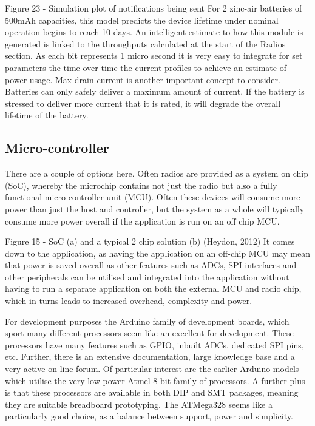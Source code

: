 \documentclass[]{article}
\begin{document}
 
Figure 23 - Simulation plot of notifications being sent
For 2 zinc-air batteries of 500mAh capacities, this model predicts the device lifetime under nominal operation begins to reach 10 days.  An intelligent estimate to how this module is generated is linked to the throughputs calculated at the start of the Radios section. As each bit represents 1 micro second it is very easy to integrate for set parameters the time over time the current profiles to achieve an estimate of power usage. 
Max drain current is another important concept to consider. Batteries can only safely deliver a maximum amount of current. If the battery is stressed to deliver more current that it is rated, it will degrade the overall lifetime of the battery. 

\subsection{Micro-controller}
There are a couple of options here. Often radios are provided as a system on chip (SoC), whereby the microchip contains not just the radio but also a fully functional micro-controller unit (MCU). Often these devices will consume more power than just the host and controller, but the system as a whole will typically consume more power overall if the application is run on an off chip MCU. 
 
Figure 15 - SoC (a) and a typical 2 chip solution (b) (Heydon, 2012)
It comes down to the application, as having the application on an off-chip MCU may mean that power is saved overall as other features such as ADCs, SPI interfaces and other peripherals can be utilised and integrated into the application without having to run a separate application on both the external MCU and radio chip, which in turns leads to increased overhead, complexity and power. 

For development purposes the Arduino family of development boards, which sport many different processors seem like an excellent for development. These processors have many features such as GPIO, inbuilt ADCs, dedicated SPI pins, etc. Further, there is an extensive documentation, large knowledge base and a very active on-line forum. Of particular interest are the earlier Arduino models which utilise the very low power Atmel 8-bit family of processors. A further plus is that these processors are available in both DIP and SMT packages, meaning they are suitable breadboard prototyping. The ATMega328 seems like a particularly good choice, as a balance between support, power and simplicity. 
\end{document}
